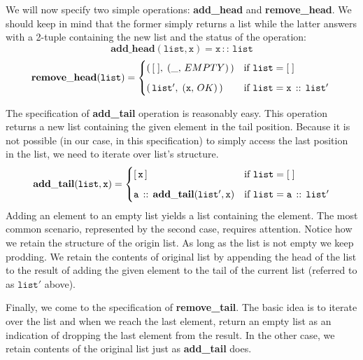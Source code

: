 \documentclass[10pt]{article}
\begin{document}
    We will now specify two simple operations: \textbf{add\_head} and \textbf{remove\_head}. We should keep in mind that the former simply returns a list while the latter answers with a 2-tuple containing the new list and the status of the operation:
    \[
        \mathtt{\mathbf{add\_head}(list, x)} = \mathtt{x \, :: \, list}
    \]
    \[
        \mathtt{\mathbf{remove\_head}(list)} = \begin{cases}
            (\, [\;], \; (\_, \,EMPTY)\,) & \mbox{if } \mathtt{list} = [\;]\vspace*{6pt}\\
            (\, \mathtt{list'}, \; (\mathtt{x}, \,OK)\,) & \mbox{if } \mathtt{list = x\,::\,list'}\\
        \end{cases}\vspace*{2pt}\\
    \]

    The specification of \textbf{add\_tail} operation is reasonably easy. This operation returns a new list containing the given element in the tail position. Because it is not possible (in our case, in this specification) to simply access the last position in the list, we need to iterate over list's structure.
    \[
        \mathtt{\mathbf{add\_tail}(list, x)} = \begin{cases}
            [\,\mathtt{x}\,] & \mbox{if } \mathtt{list} = [\;]\vspace*{6pt}\\
            \mathtt{a}\,::\, \mathtt{\mathbf{add\_tail}(list', x)} & \mbox{if } \mathtt{list = a\,::\,list'}\\
        \end{cases}\vspace*{2pt}
    \]    
    Adding an element to an empty list yields a list containing the element. The most common scenario, represented by the second case, requires attention. Notice how we retain the structure of the origin list. As long as the list is not empty we keep prodding. We retain the contents of original list by appending the head of the list to the result of adding the given element to the tail of the current list (referred to as $\mathtt{list'}$ above). 

    Finally, we come to the specification of \textbf{remove\_tail}. The basic idea is to iterate over the list and when we reach the last element, return an empty list as an indication of dropping the last element from the result. In the other case, we retain contents of the original list just as \textbf{add\_tail} does.
    
\end{document}
